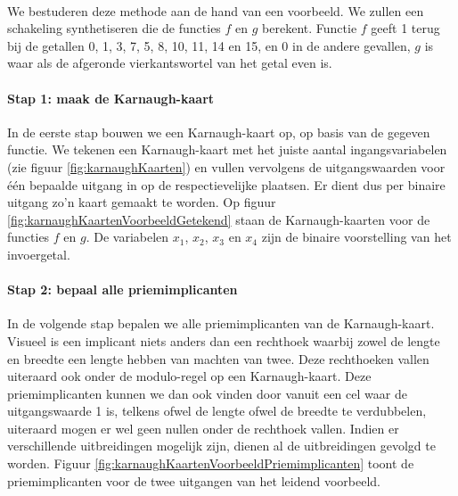 \paragraph{}
We bestuderen deze methode aan de hand van een voorbeeld. We zullen een schakeling synthetiseren die de functies $f$ en $g$ berekent. Functie $f$ geeft 1 terug bij de getallen 0, 1, 3, 7, 5, 8, 10, 11, 14 en 15, en 0 in de andere gevallen, $g$ is waar  als de afgeronde vierkantswortel van het getal even is.
\paragraph{Stap 1: maak de Karnaugh-kaart}
In de eerste stap bouwen we een Karnaugh-kaart op, op basis van de gegeven functie. We tekenen een Karnaugh-kaart met het juiste aantal ingangsvariabelen (zie figuur \ref{fig:karnaughKaarten}) en vullen vervolgens de uitgangswaarden voor \'e\'en bepaalde uitgang in op de respectievelijke plaatsen. Er dient dus per binaire uitgang zo'n kaart gemaakt te worden. Op figuur \ref{fig:karnaughKaartenVoorbeeldGetekend}
staan de Karnaugh-kaarten voor de functies $f$ en $g$. De variabelen $x_1$, $x_2$, $x_3$ en $x_4$ zijn de binaire voorstelling van het invoergetal.
\paragraph{Stap 2: bepaal alle priemimplicanten} In de volgende stap bepalen we alle priemimplicanten van de Karnaugh-kaart. Visueel is een implicant niets anders dan een rechthoek waarbij zowel de lengte en breedte een lengte hebben van machten van twee. Deze rechthoeken vallen uiteraard ook onder de modulo-regel op een Karnaugh-kaart. Deze priemimplicanten kunnen we dan ook vinden door vanuit een cel waar de uitgangswaarde 1 is, telkens ofwel de lengte ofwel de breedte te verdubbelen, uiteraard mogen er wel geen nullen onder de rechthoek vallen. Indien er verschillende uitbreidingen mogelijk zijn, dienen al de uitbreidingen gevolgd te worden. Figuur \ref{fig:karnaughKaartenVoorbeeldPriemimplicanten} toont de priemimplicanten voor de twee uitgangen van het leidend voorbeeld.
